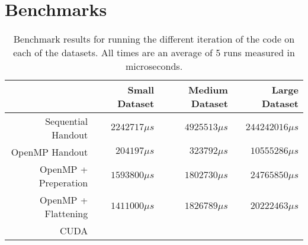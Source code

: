 \section{Benchmarks}



\begin{table}[H]
    \centering
    \begin{tabular}{r|r|r|r}
                             &  Small Dataset & Medium Dataset &    Large Dataset \\ \hline
        Sequential Handout   & $2242717\mu s$ & $4925513\mu s$ & $244242016\mu s$ \\
        OpenMP Handout       &  $204197\mu s$ &  $323792\mu s$ &  $10555286\mu s$ \\
        OpenMP + Preperation & $1593800\mu s$ & $1802730\mu s$ &  $24765850\mu s$ \\
        OpenMP + Flattening  & $1411000\mu s$ & $1826789\mu s$ &  $20222463\mu s$ \\
        CUDA                 &                &                &             
    \end{tabular}
    \caption{Benchmark results for running the different iteration of the code
        on each of the datasets. All times are an average of 5 runs measured in
        microseconds.}
    \label{tab:benchmarks}
\end{table}









